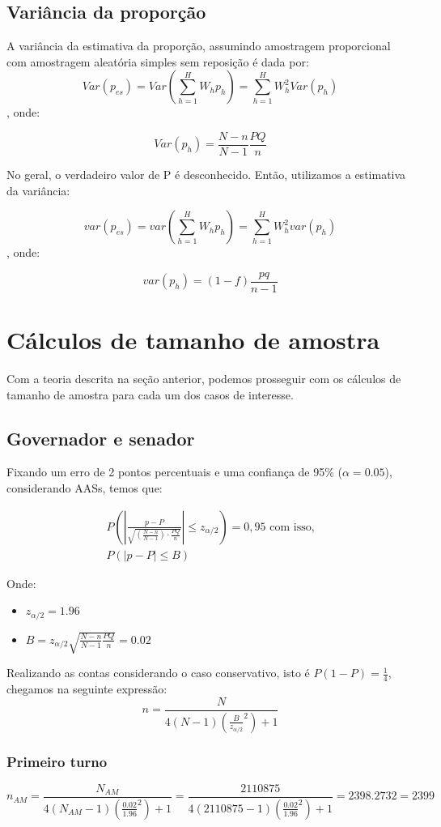 \documentclass{article}
\begin{document}
\subsection*{Variância da proporção}
A variância da estimativa da proporção, assumindo amostragem proporcional com amostragem aleatória simples sem reposição é dada por:
\[
Var(p_{es}) = Var(\sum_{h = 1}^{H}W_h p_h) = \sum_{h = 1}^{H}W_h ^ 2 Var(p_h)
\], onde:

\[
Var(p_h) = \frac{N-n}{N-1}\frac{PQ}{n}
\]

No geral, o verdadeiro valor de P é desconhecido. Então, utilizamos a estimativa da variância:

\[
var(p_{es}) = var(\sum_{h = 1}^{H}W_h p_h) = \sum_{h = 1}^{H}W_h ^ 2 var(p_h)
\], onde:

\[
var(p_h) = (1-f)\frac{pq}{n-1}
\]


\section*{Cálculos de tamanho de amostra}
Com a teoria descrita na seção anterior, podemos prosseguir com os cálculos de tamanho de amostra para
cada um dos casos de interesse.

\subsection*{Governador e senador}

Fixando um erro de 2 pontos percentuais e uma confiança de 95\% ($\alpha = 0.05$), considerando AASs, temos que:

\[
\begin{array}{l}
P\left( \left| \frac{p - P}{\sqrt{ \left( \frac{N - n}{N - 1} \right) \cdot \frac{PQ}{n} }} \right| \leq z_{\alpha/2} \right) = 0{,}95 \text{ com isso,}\\ 
P\left( \left| p - P \right| \leq B \right)
\end{array}
\]

Onde:
\begin{itemize}
    \item $z_{\alpha/2} = 1.96$
    \item $B = z_{\alpha/2}\sqrt{\frac{N-n}{N-1}\frac{PQ}{n}} = 0.02$
\end{itemize}

Realizando as contas considerando o caso conservativo, isto é $P(1-P) = \frac{1}{4}$, chegamos na seguinte expressão:
\[
n = \frac{N}{4(N-1)(\frac{B}{z_{\alpha/2}}^2) + 1}
\]
\subsubsection*{Primeiro turno}
\[
n_{AM} = \frac{N_{AM}}{4(N_{AM}-1)(\frac{0.02}{1.96}^2) + 1 } = \frac{2110875}{4(2110875 - 1) (\frac{0.02}{1.96}^2) + 1} = 2398.2732 = 2399
\]
\end{document}
